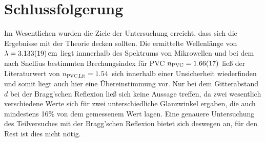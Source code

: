\section{Schlussfolgerung}

	Im Wesentlichen wurden die Ziele der Untersuchung erreicht, dass sich die Ergebnisse mit der Theorie decken sollten.
	Die ermittelte Wellenlänge von $\lambda = \SI{3.133+-0.019}{\centi\meter}$ liegt innnerhalb des Spektrums von Mikrowellen und bei dem nach Snellius bestimmten Brechungsindex für PVC $n_\text{PVC} = \SI{1.66+-0.17}{}$ ließ der Literaturwert von $n_\text{PVC,Lit} = \SI{1,54}{}$ sich innerhalb einer Unsicherheit wiederfinden und somit liegt auch hier eine Übereinstimmung vor.
	Nur bei dem Gitterabstand $d$ bei der Bragg'schen Reflexion ließ sich keine Aussage treffen, da zwei wesentlich verschiedene Werte sich für zwei unterschiedliche Glanzwinkel ergaben, die auch mindestens 16\% von dem gemessenem Wert lagen.
	Eine genauere Untersuchung des Teilversuches mit der Bragg'schen Reflexion bietet sich deswegen an, für den Rest ist dies nicht nötig.